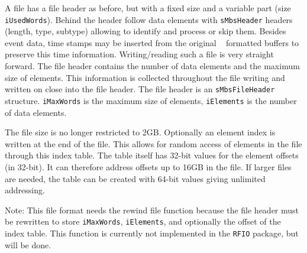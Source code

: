 A file has a file header as before, but with a fixed size and a variable part (size {\tt iUsedWords}).
Behind the header follow data elements with {\tt sMbsHeader} headers (length, type, subtype) allowing to identify and process or skip them. Besides event data, time stamps may be inserted from the original \mbs~ formatted buffers to preserve this time information. Writing/reading such a file is very straight forward. The file header contains the number of data elements and the maximum size of elements. This information is collected throughout the file writing and written on close into the file header. The file header is an {\tt sMbsFileHeader} structure.
{\tt iMaxWords} is the maximum size of elements,
{\tt iElements} is the number of data elements.

The file size is no longer restricted to 2GB. Optionally an element index is written at the end of the file. This allows for random access of elements in the file through this index table. The table itself has 32-bit values for the element offsets (in 32-bit). It can therefore address offsets up to 16GB in the file. If larger files are needed, the table can be created with 64-bit values giving unlimited addressing.

Note: This file format needs the rewind file function because the file header must be rewritten to store {\tt iMaxWords}, {\tt iElements}, and optionally the offset of the index table. This function is currently not implemented in the {\tt RFIO} package, but will be done.

